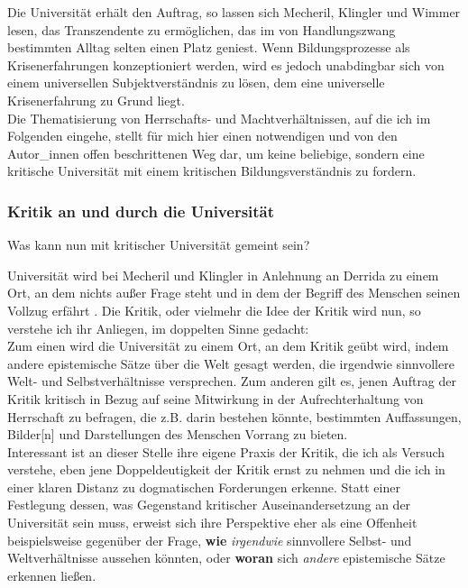 \noindent Die Universität erhält den Auftrag, so lassen sich Mecheril, Klingler und
Wimmer lesen, das Transzendente zu ermöglichen, das im von Handlungszwang
bestimmten Alltag selten einen Platz geniest. Wenn Bildungsprozesse als
Krisenerfahrungen konzeptioniert werden, wird es jedoch unabdingbar sich von
einem universellen Subjektverständnis zu lösen, dem eine universelle
Krisenerfahrung zu Grund liegt.\\
Die Thematisierung von Herrschafts- und
Machtverhältnissen, auf die ich im Folgenden eingehe, stellt für mich hier
einen notwendigen und von den Autor\_innen offen beschrittenen Weg dar, um
keine beliebige, sondern eine kritische Universität mit einem kritischen
Bildungsverständnis zu fordern.

\subsubsection{Kritik an und durch die Universität}

Was kann nun mit kritischer Universität gemeint sein? 

\noindent Universität wird bei
Mecheril und Klingler in Anlehnung an Derrida \footnotemark
{} zu einem Ort, an dem nichts
außer Frage steht und in dem der \glqq Begriff des Menschen seinen Vollzug
erfährt \grqq\footnotemark {}.
Die Kritik, oder vielmehr die Idee der Kritik wird nun, so verstehe
ich ihr Anliegen, im doppelten Sinne gedacht:\\ 
Zum einen wird die Universität zu
einem Ort, an dem Kritik geübt wird, indem \glqq andere epistemische Sätze\grqq \footnotemark {} über
die Welt gesagt werden, die \glqq irgendwie sinnvollere Welt- und
Selbstverhältnisse\grqq\footnotemark {} versprechen. 
Zum anderen gilt es, jenen Auftrag der Kritik
kritisch in Bezug auf seine Mitwirkung in der Aufrechterhaltung von Herrschaft
zu befragen, die z.B. darin bestehen könnte, bestimmten \glqq Auffassungen,
Bilder[n] und Darstellungen des Menschen\grqq\footnotemark
{} Vorrang zu bieten.\\
Interessant ist an dieser Stelle ihre eigene Praxis der Kritik, die ich als Versuch verstehe,
eben jene Doppeldeutigkeit der Kritik ernst zu nehmen und die ich in einer
klaren Distanz zu dogmatischen Forderungen erkenne. Statt einer Festlegung
dessen, was Gegenstand kritischer Auseinandersetzung an der Universität sein
muss, erweist sich ihre Perspektive eher als eine Offenheit beispielsweise
gegenüber der Frage, \textbf{wie} \textit{irgendwie} sinnvollere Selbst- und Weltverhältnisse
aussehen könnten, oder \textbf{woran} sich \textit{andere} epistemische Sätze erkennen ließen.\\


